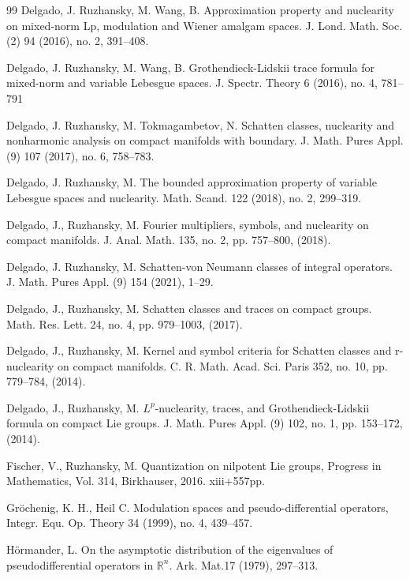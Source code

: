 \documentclass[12pt, reqno]{amsart}
\theoremstyle{definition}
\theoremstyle{remark}
\numberwithin{equation}{section}
\begin{document}
\begin{thebibliography}{99}
  Delgado, J. Ruzhansky, M. Wang, B. Approximation property and nuclearity on mixed-norm Lp, modulation and Wiener amalgam spaces. J. Lond. Math. Soc. (2) 94 (2016), no. 2, 391--408.

  Delgado, J. Ruzhansky, M. Wang, B. Grothendieck-Lidskii trace formula for mixed-norm and variable Lebesgue spaces. J. Spectr. Theory 6 (2016), no. 4, 781–791


  Delgado, J. Ruzhansky, M. Tokmagambetov, N. Schatten classes, nuclearity and nonharmonic analysis on compact manifolds with boundary. J. Math. Pures Appl. (9) 107 (2017), no. 6, 758–783.

 Delgado, J. Ruzhansky, M. The bounded approximation property of variable Lebesgue spaces and nuclearity. Math. Scand. 122 (2018), no. 2, 299--319.

 Delgado, J., Ruzhansky, M.  Fourier multipliers, symbols, and nuclearity on compact manifolds. J. Anal. Math. 135, no. 2, pp. 757--800, (2018).

  Delgado, J. Ruzhansky, M. Schatten-von Neumann classes of integral operators. J. Math. Pures Appl. (9) 154 (2021), 1--29.

  Delgado, J., Ruzhansky, M.  Schatten classes and traces on compact groups. Math. Res. Lett. 24, no. 4, pp. 979--1003, (2017).


  Delgado, J., Ruzhansky, M.   Kernel and symbol criteria for Schatten classes and r-nuclearity on compact manifolds. C. R. Math. Acad. Sci. Paris 352, no. 10, pp. 779--784, (2014).

   Delgado, J., Ruzhansky, M. $L^p$-nuclearity, traces, and Grothendieck-Lidskii formula on compact Lie groups. J. Math. Pures Appl. (9) 102, no. 1, pp. 153--172, (2014).



 Fischer, V., Ruzhansky, M. Quantization on nilpotent Lie groups, Progress in Mathematics, Vol. 314, Birkhauser, 2016. xiii+557pp.

 Gr\"ochenig, K. H.,  Heil C. Modulation spaces and pseudo-differential operators,
Integr. Equ. Op. Theory 34 (1999), no. 4, 439--457.


  H\"ormander, L.  On the asymptotic distribution of the eigenvalues of pseudodifferential operators in $\mathbb{R}^n.$ Ark. Mat.17 (1979), 297--313.



\end{thebibliography}
\end{document}
